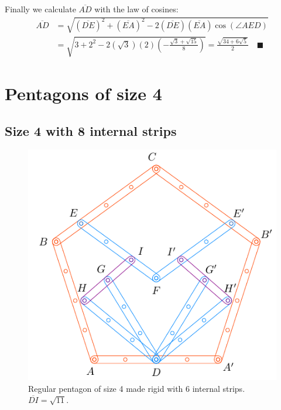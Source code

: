 \documentclass[11pt]{article}
\begin{document}
Finally we calculate $\overline{AD}$ with the law of cosines:
\begin{align}
\overline{AD} &= \sqrt{(\overline{DE})^2 + (\overline{EA})^2 
 - 2(\overline{DE})(\overline{EA})\cos(\angle{AED})} \nonumber\\
 &= \sqrt{3 + 2^2 - 2(\sqrt3)(2)\left(-\frac{\sqrt3 + \sqrt{15}}8\right)} 
 = \frac{\sqrt{34 + 6\sqrt5}}2 \quad\blacksquare
\end{align}


\section{Pentagons of size 4}

\subsection{Size 4 with 8 internal strips}

\begin{figure}[H]
\centering
\includegraphics[scale=1.1]{4/penta4-8a}
\caption{Regular pentagon of size 4 made rigid with 6 internal strips. $\overline{DI} = \sqrt{11}$.}
\label{fig:penta4-8a}
\end{figure}
\end{document}
